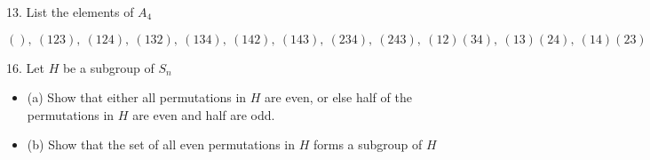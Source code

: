 \newpage
\begin{mdframed}[style=darkQuesion]
  13. List the elements of $A_4$
\end{mdframed}
\begin{mdframed}[style=darkAnswer,frametitle={Joe Starr}]
  $(),\ (123),\ (124),\ (132),\ (134),\ (142),\ (143),\ (234),\ (243),\ (12)(34),\ (13)(24),\ (14)(23)$
\end{mdframed}
\newpage
\begin{mdframed}[style=darkQuesion]
  16. Let $H$ be a subgroup of $S_{n}$
  \begin{itemize}
    \item []{(a) Show that either all permutations in $H$ are even, or else half of the permutations
    in $H$ are even and half are odd.}
    \item []{(b) Show that the set of all even permutations in $H$ forms a subgroup of $H$}
  \end{itemize}
\end{mdframed}
